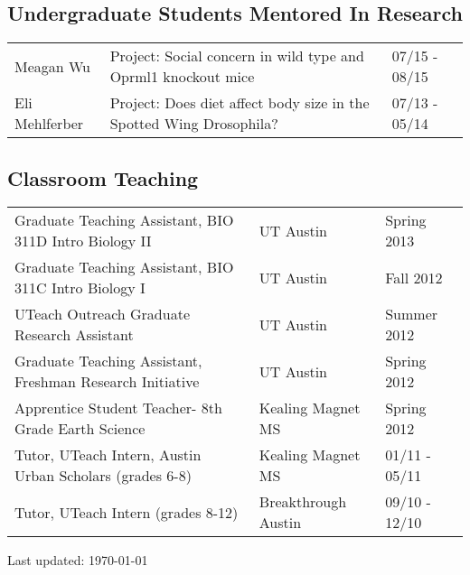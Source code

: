 \documentclass[letterpaper]{article}
\begin{document}
\subsection*{Undergraduate Students Mentored In Research}
\begin{tabular}{lll}
Meagan Wu	& {Project: Social concern in wild type and Oprml1 knockout mice}	& {07/15 - 08/15} \\
Eli Mehlferber	& {Project: Does diet affect body size in the Spotted Wing Drosophila?}	& {07/13 - 05/14} \\
\end{tabular}

\subsection*{Classroom Teaching}
\begin{tabular}{lll}
Graduate Teaching Assistant, BIO 311D Intro Biology II	& UT Austin		& Spring 2013 \\
Graduate Teaching Assistant, BIO 311C Intro Biology I	& UT Austin		& Fall 2012 \\
UTeach Outreach Graduate Research Assistant			& UT Austin		& Summer 2012 \\
Graduate Teaching Assistant, Freshman Research Initiative	& UT Austin		& Spring 2012 \\
Apprentice Student Teacher- 8th Grade Earth Science	& Kealing Magnet MS	& Spring 2012 \\
Tutor, UTeach Intern, Austin Urban Scholars (grades 6-8)& Kealing Magnet MS	& 01/11 - 05/11 \\
Tutor, UTeach Intern (grades 8-12)			& Breakthrough Austin	& 09/10 - 12/10 \\
\end{tabular}



\bigskip

\begin{center}
  \begin{footnotesize}
    Last updated: \today \\
  \end{footnotesize}
\end{center}
\end{document}
